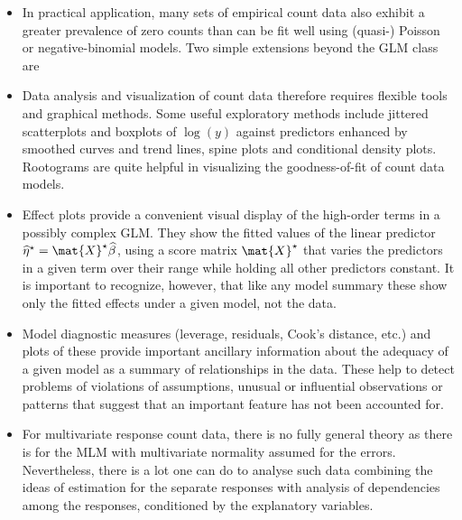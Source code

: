 \begin{itemize}
  \item In practical application, many sets of empirical count data also exhibit a greater prevalence of
  zero counts than can be fit well using (quasi-) Poisson or negative-binomial models.  Two simple
  extensions beyond the GLM class are

  \item Data analysis and visualization of count data therefore requires  flexible tools and graphical
  methods.  Some useful exploratory methods include jittered scatterplots and boxplots of $\log(y)$
  against predictors enhanced by smoothed curves and trend lines, spine plots and conditional density plots.
  Rootograms are quite helpful in visualizing the goodness-of-fit of count data models.

  \item Effect plots provide a convenient visual display of the high-order terms in a possibly complex GLM.
  They show the fitted values of the linear predictor $\widehat{\eta}^\star = \mat{X}^\star \widehat{\beta}$,
  using a score matrix $\mat{X}^\star$ that varies the predictors in a given term over their range while holding
  all other predictors constant.  It is important to recognize, however, that like any model summary
  these show only the fitted
  effects under a given model, not the data.

  \item Model diagnostic measures (leverage, residuals, Cook's distance, etc.) and plots of these provide
  important ancillary information about the adequacy of a given model as a summary of relationships in the
  data.  These help to detect problems of violations of assumptions, unusual or influential observations
  or patterns that suggest that an important feature has not been accounted for.

  \item For multivariate response count data, there is no fully general theory as there is for the
  MLM with multivariate normality assumed for the errors.
  Nevertheless, there is a lot one can do to analyse such data combining the ideas of estimation for
  the separate responses with analysis of dependencies among the responses, conditioned by the
  explanatory variables.


\end{itemize} 